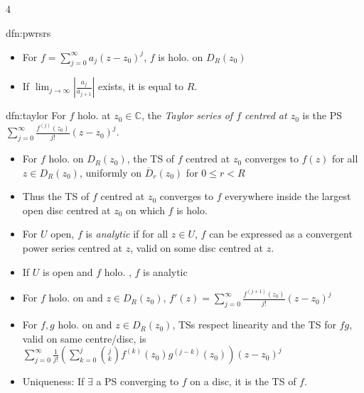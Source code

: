 \documentclass[landscape, 8pt]{extarticle}
\begin{document}
\begin{multicols*}{4}
\begin{dfn}{dfn:pwrsrs}{ }
			\begin{itemize}
				\item For $f = \sum_{j=0}^{\infty}a_j (z-z_0)^j$, $f$ is holo. on $D_R(z_0)$
				\item If $\lim_{j\to \infty}\left|\frac{a_j}{a_{j+1}}\right|$ exists, it is equal to $R$.
			\end{itemize}
			
		\end{dfn}
		
		
		\begin{dfn}{dfn:taylor}{ }
			For $f$ holo. at $z_0 \in \mathbb{C}$, the \textit{Taylor series of $f$ centred at $z_0$} is the PS $\sum_{j=0}^{\infty}\frac{f^{(j)}(z_0)}{j!}(z-z_0)^j$.
			\begin{itemize}
				\item For $f$ holo. on $D_R(z_0)$, the TS of $f$ centred at $z_0$ converges to $f(z)$ for all $z \in D_R(z_0)$, uniformly on $\overline{D}_r(z_0)$ for $0 \le r < R$ 
				\item Thus the TS of $f$ centred at $z_0$ converges to $f$ everywhere inside the largest open disc centred at $z_0$ on which $f$ is holo.
				\item For $U$ open, $f$ is \textit{analytic} if for all $z\in U$, $f$ can be expressed as a convergent power series centred at $z$, valid on some disc centred at $z$.
				\item If $U$ is open and $f$ holo. , $f$ is analytic
				\item For $f$ holo. on and $z \in D_R(z_0)$, $f'(z) = \sum_{j=0}^{\infty}\frac{f^{(j+1)}(z_0)}{j!}(z-z_0)^j$
				\item For $f, g$ holo. on and $z \in D_R(z_0)$, TSs respect linearity and the TS for $fg$, valid on same centre/disc, is $\sum_{j=0}^{\infty}\frac{1}{j!}\left( \sum_{k=0}^{j} \binom{j}{k} f^{(k)}(z_0) g^{(j-k)}(z_0)\right)(z-z_0)^j$
				\item Uniqueness: If $\exists$ a PS converging to $f$ on a disc, it is the TS of $f$.
			\end{itemize}
			
			
		\end{dfn}
		

\end{multicols*}
\end{document}
